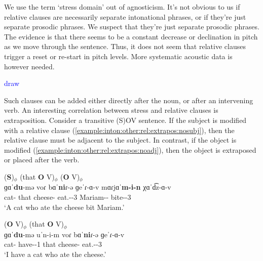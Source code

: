 We use the term `stress domain' out of agnosticism. It's not obvious to us if relative clauses are necessarily separate intonational phrases, or if they're just separate prosodic phrases. We suspect that they're just separate prosodic phrases. The evidence is that there seems to be a constant decrease or declination in pitch as we move through the sentence. Thus, it does not seem that relative clauses trigger a reset or re-start in pitch levels. More systematic acoustic data is however needed. 

\textcolor{blue}{draw}




Such clauses can be added either directly after the noun, or after an intervening verb.  An interesting correlation between stress and relative clauses is extraposition. Consider a transitive (S)OV sentence. If the subject is modified with a relative clause (\ref{example:inton:other:rel:extrapos:nosubj}), then the relative clause must be adjacent to the subject. In contrast, if the object is modified (\ref{example:inton:other:rel:extrapos:noadj}), then the object is extraposed or placed after the verb. 

\begin{exe}
	\ex \begin{xlist}
		\ex \glll  ({{\textbf{S}}})$_\phi$  (that {\textbf{O}} V)$_\phi$ (\textbf{O} V)$_\phi$ \\
		{{ɡɑˈ\textbf{du}-mə}} voɾ   {{bɑˈ\textbf{ni}ɾ-ə}} {ɡeˈɾ-ɑ-v}  mɑɾjɑˈ\textbf{m-i-n} χɑˈd͡z-ɑ-v
		\\
		cat-{\indf} that   cheese-{} eat.{\aorperf}-{\pst}-3{\sg}  Mariam-{\dat}-{} bite-{\pst}-3{\sg}
		\\
		\trans `A cat who ate  the cheese bit Mariam.'
		\label{example:inton:other:rel:extrapos:nosubj}
		\\
		
		\ex \glll  ({{\textbf{O}}} V)$_\phi$  (that {\textbf{O}} V)$_\phi$ \\
		{{ɡɑˈ\textbf{du}-mə}} {uˈ{n-i-m}}   voɾ {{bɑˈ\textbf{ni}ɾ-ə}} {ɡeˈɾ-ɑ-v} 
		\\
		cat-{\indf} have-{\thgloss}-1{\sg} that cheese-{} eat.{\aorperf}-{\pst}-3{\sg} 
		\\
		\trans `I have a   cat who ate the cheese.'
		\label{example:inton:other:rel:extrapos:noadj}
		\\
	\end{xlist}
	
\end{exe}

